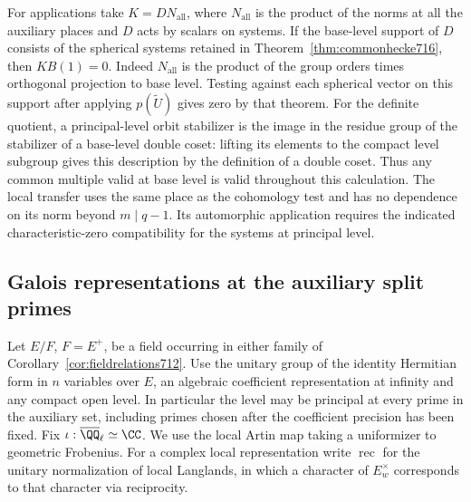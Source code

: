\documentclass[a4paper,11pt]{article}
\theoremstyle{definition}
\theoremstyle{remark}
\numberwithin{equation}{section}
\begin{document}
For applications take \(K=D N_{\mathrm{all}}\), where
\(N_{\mathrm{all}}\) is the product of the norms at all the
auxiliary places and \(D\) acts by scalars on systems.
If the base-level support of \(D\) consists of the spherical
systems retained in Theorem~\ref{thm:commonhecke716}, then
\(K B(1)=0\). Indeed \(N_{\mathrm{all}}\) is the product of
the group orders times orthogonal projection to base level.
Testing against each spherical vector on this support after
applying \(p(\widetilde U)\) gives zero by that theorem.
For the definite quotient, a principal-level orbit stabilizer
is the image in the residue group of the stabilizer of a
base-level double coset: lifting its elements to the compact
level subgroup gives this description by the definition of a
double coset. Thus any common multiple valid at base level is
valid throughout this calculation. The local transfer uses the
same place as the cohomology test and has no dependence on its
norm beyond \(m\mid q-1\). Its automorphic application requires
the indicated characteristic-zero compatibility for the
systems at principal level.
\clearpage

\subsection{Galois representations at the auxiliary split primes}
\label{sec:splitattachment722}

Let \(E/F\), \(F=E^+\), be a field occurring in either family of
Corollary~\ref{cor:fieldrelations712}. Use the unitary group of
the identity Hermitian form in \(n\) variables over \(E\), an
algebraic coefficient representation at infinity and any compact
open level. In particular the level may be principal at every
prime in the auxiliary set, including primes chosen after the
coefficient precision has been fixed. Fix
\(\iota:\overline{\QQ}_\ell\simeq\CC\). We use the local
Artin map taking a uniformizer to geometric Frobenius. For
a complex local representation write \(\operatorname{rec}\)
for the unitary normalization of local Langlands, in which a
character of \(E_w^\times\) corresponds to that character via
reciprocity.
\end{document}
